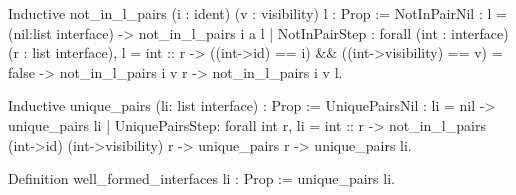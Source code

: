 Inductive not_in_l_pairs (i : ident) (v : visibility) l : Prop :=
    NotInPairNil  : l = (nil:list interface) -> not_in_l_pairs i a l
  | NotInPairStep : forall (int : interface) (r : list interface),
            l = int :: r                                         ->
            ((int->id) == i) && ((int->visibility) == v) = false -> 
            not_in_l_pairs i v r                                 -> 
            not_in_l_pairs i v l.

Inductive unique_pairs (li: list interface) : Prop :=
    UniquePairsNil : li = nil -> unique_pairs li
  | UniquePairsStep: forall int r,
                      li = int :: r                                ->
                      not_in_l_pairs (int->id) (int->visibility) r ->
                      unique_pairs r                               ->
                      unique_pairs li.
                      
Definition well_formed_interfaces li : Prop := unique_pairs li.